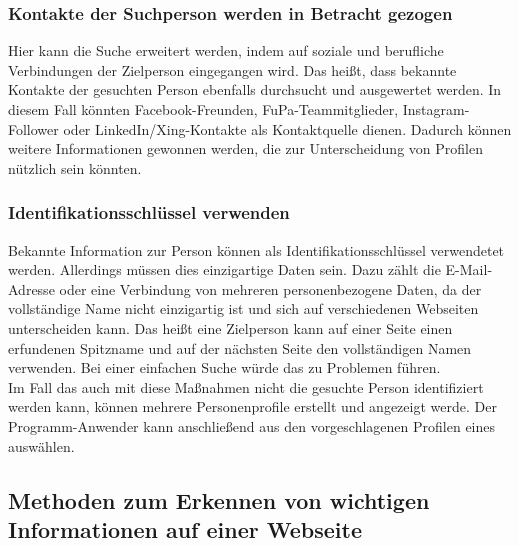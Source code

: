 		\subsubsection{Kontakte der Suchperson werden in Betracht gezogen}	
		Hier kann die Suche erweitert werden, indem auf soziale und berufliche Verbindungen der Zielperson eingegangen wird. Das heißt, dass bekannte Kontakte der gesuchten Person ebenfalls durchsucht und ausgewertet werden. In diesem Fall könnten Facebook-Freunden, FuPa-Teammitglieder, Instagram-Follower oder LinkedIn/Xing-Kontakte als Kontaktquelle dienen. Dadurch können weitere Informationen gewonnen werden, die zur Unterscheidung von Profilen nützlich sein könnten.
		\subsubsection{Identifikationsschlüssel verwenden}
		Bekannte Information zur Person können als Identifikationsschlüssel verwendetet werden. Allerdings müssen dies einzigartige Daten sein. Dazu zählt die E-Mail-Adresse oder eine Verbindung von mehreren personenbezogene Daten, da der vollständige Name nicht einzigartig ist und sich auf verschiedenen Webseiten unterscheiden kann. Das heißt eine Zielperson kann auf einer Seite einen erfundenen Spitzname und auf der nächsten Seite den vollständigen Namen verwenden. Bei einer einfachen Suche würde das zu Problemen führen.\\
		
		Im Fall das auch mit diese Maßnahmen nicht die gesuchte Person identifiziert werden kann, können mehrere Personenprofile erstellt und angezeigt werde. Der Programm-Anwender kann anschließend aus den vorgeschlagenen Profilen eines auswählen.  
		
	\subsection{Methoden zum Erkennen von wichtigen Informationen auf einer Webseite}
	
